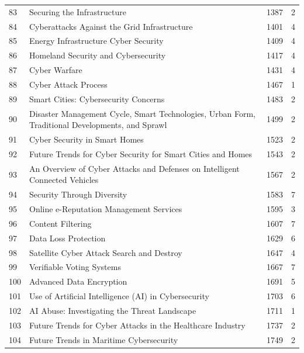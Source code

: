 \documentclass[10pt,letterpaper,oneside]{article}
\begin{document}
\begin{longtable}{@{}p{}p{}p{}p{}@{}}
83 & Securing the Infrastructure & 1387 & 2 \\
84 & Cyberattacks Against the Grid Infrastructure & 1401 & 4 \\
85 & Energy Infrastructure Cyber Security & 1409 & 4 \\
86 & Homeland Security and Cybersecurity & 1417 & 4 \\
87 & Cyber Warfare & 1431 & 4 \\
88 & Cyber Attack Process & 1467 & 1 \\
89 & Smart Cities: Cybersecurity Concerns & 1483 & 2 \\
90 & Disaster Management Cycle, Smart Technologies, Urban Form, Traditional Developments, and Sprawl & 1499 & 2 \\
91 & Cyber Security in Smart Homes & 1523 & 2 \\
92 & Future Trends for Cyber Security for Smart Cities and Homes & 1543 & 2 \\
93 & An Overview of Cyber Attacks and Defenses on Intelligent Connected Vehicles & 1567 & 2 \\
94 & Security Through Diversity & 1583 & 7 \\
95 & Online e-Reputation Management Services & 1595 & 3 \\
96 & Content Filtering & 1607 & 7 \\
97 & Data Loss Protection & 1629 & 6 \\
98 & Satellite Cyber Attack Search and Destroy & 1647 & 4 \\
99 & Verifiable Voting Systems & 1667 & 7 \\
100 & Advanced Data Encryption & 1691 & 5 \\
101 & Use of Artificial Intelligence (AI) in Cybersecurity & 1703 & 6 \\
102 & AI Abuse: Investigating the Threat Landscape & 1711 & 1 \\
103 & Future Trends for Cyber Attacks in the Healthcare Industry & 1737 & 2 \\
104 & Future Trends in Maritime Cybersecurity & 1749 & 2 \\
\end{longtable}\par\medskip\normalsize
\end{document}
